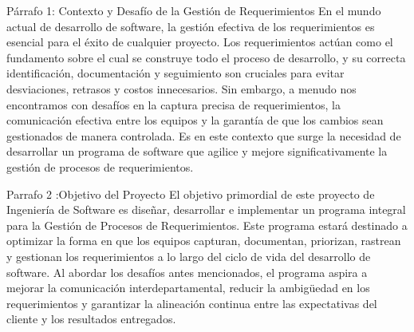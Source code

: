 Párrafo 1: Contexto y Desafío de la Gestión de Requerimientos
En el mundo actual de desarrollo de software, la gestión efectiva de los requerimientos es esencial para el éxito de cualquier proyecto. Los requerimientos actúan como el fundamento sobre el cual se construye todo el proceso de desarrollo, y su correcta identificación, documentación y seguimiento son cruciales para evitar desviaciones, retrasos y costos innecesarios. Sin embargo, a menudo nos encontramos con desafíos en la captura precisa de requerimientos, la comunicación efectiva entre los equipos y la garantía de que los cambios sean gestionados de manera controlada. Es en este contexto que surge la necesidad de desarrollar un programa de software que agilice y mejore significativamente la gestión de procesos de requerimientos.

Parrafo 2 :Objetivo del Proyecto
El objetivo primordial de este proyecto de Ingeniería de Software es diseñar, desarrollar e implementar un programa integral para la Gestión de Procesos de Requerimientos. Este programa estará destinado a optimizar la forma en que los equipos capturan, documentan, priorizan, rastrean y gestionan los requerimientos a lo largo del ciclo de vida del desarrollo de software. Al abordar los desafíos antes mencionados, el programa aspira a mejorar la comunicación interdepartamental, reducir la ambigüedad en los requerimientos y garantizar la alineación continua entre las expectativas del cliente y los resultados entregados.
